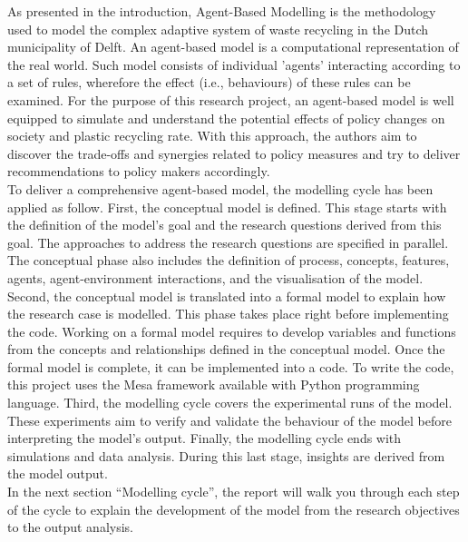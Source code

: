\noindent As presented in the introduction, Agent-Based Modelling is the methodology used to model the complex adaptive system of waste recycling in the Dutch municipality of Delft. An agent-based model is a computational representation of the real world. Such model consists of individual 'agents' interacting according to a set of rules, wherefore the effect (i.e., behaviours) of these rules can be examined. For the purpose of this research project, an agent-based model is well equipped to simulate and understand the potential effects of policy changes on society and plastic recycling rate. With this approach, the authors aim to discover the trade-offs and synergies related to policy measures and try to deliver recommendations to policy makers accordingly.\\

\noindent To deliver a comprehensive agent-based model, the modelling cycle has been applied as follow. First, the conceptual model is defined. This stage starts with the definition of the model’s goal and the research questions derived from this goal. The approaches to address the research questions are specified in parallel. The conceptual phase also includes the definition of process, concepts, features, agents, agent-environment interactions, and the visualisation of the model. Second, the conceptual model is translated into a formal model to explain how the research case is modelled. This phase takes place right before implementing the code. Working on a formal model requires to develop variables and functions from the concepts and relationships defined in the conceptual model. Once the formal model is complete, it can be implemented into a code. To write the code, this project uses the Mesa framework available with Python programming language. Third, the modelling cycle covers the experimental runs of the model. These experiments aim to verify and validate the behaviour of the model before interpreting the model’s output. Finally, the modelling cycle ends with simulations and data analysis. During this last stage, insights are derived from the model output.\\

\noindent In the next section “Modelling cycle”, the report will walk you through each step of the cycle to explain the development of the model from the research objectives to the output analysis.\\

